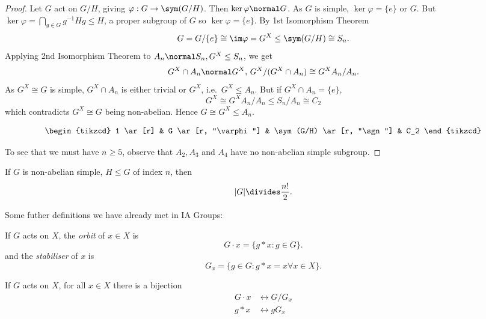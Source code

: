 \documentclass[a4paper]{article}
\theoremstyle{definition}
\begin{document}
\begin{proof}
  Let \(G\) act on \(G/H\), giving \(\varphi: G \to \sym(G/H)\). Then \(\ker \varphi \normal G\). As \(G\) is simple, \(\ker \varphi = \{e\}\) or \(G\). But \(\ker \varphi = \bigcap_{g \in G} g^{-1}Hg \leq H\), a proper subgroup of \(G\) so \(\ker \varphi = \{e\}\). By 1st Isomorphism Theorem
  \[
    G = G/\{e\} \cong \im \varphi = G^X \leq \sym(G/H) \cong S_n.
  \]
  Applying 2nd Isomorphism Theorem to \(A_n \normal S_n, G^X \leq S_n\), we get
  \[
    G^X \cap A_n \normal G^X, \, G^X/(G^X \cap A_n) \cong G^XA_n/A_n.
  \]
  As \(G^X \cong G\) is simple, \(G^X \cap A_n\) is either trivial or \(G^X\), i.e.\ \(G^X \leq A_n\). But if \(G^X \cap A_n = \{e\}\),
  \[
    G^X \cong G^XA_n/A_n \leq S_n/A_n \cong C_2
  \]
  which contradicts \(G^X \cong G\) being non-abelian. Hence \(G \cong G^X \leq A_n\).

  \[
    \begin{tikzcd}
      1 \ar[r] & G \ar[r, "\varphi"] & \sym(G/H) \ar[r, "\sgn"] & C_2
    \end{tikzcd}
  \]
  
  To see that we must have \(n \geq 5\), observe that \(A_2, A_3\) and \(A_4\) have no non-abelian simple subgroup.
\end{proof}

\begin{corollary}
  If \(G\) is non-abelian simple, \(H \leq G\) of index \(n\), then
  \[
    |G| \divides \frac{n!}{2}.
  \]
\end{corollary}

Some futher definitions we have already met in IA Groups:

\begin{definition}
  If \(G\) acts on \(X\), the \emph{orbit} of \(x \in X\) is
  \[
    G \cdot x = \{g * x: g \in G\}.
  \]
  and the \emph{stabiliser} of \(x\) is
  \[
    G_x = \{g \in G: g * x = x \forall x \in X\}.
  \]
\end{definition}

\begin{theorem}
  \label{thm:orbit-stabiliser}
  If \(G\) acts on \(X\), for all \(x \in X\) there is a bijection
  \begin{align*}
    G \cdot x &\leftrightarrow G/G_x \\
    g * x &\leftrightarrow gG_x
  \end{align*}
\end{theorem}
\end{document}
